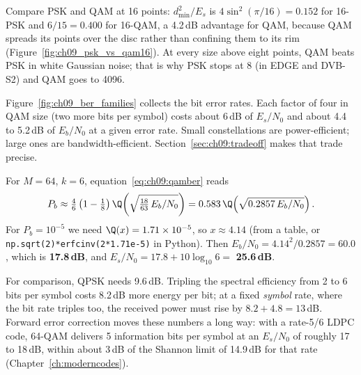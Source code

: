 Compare PSK and QAM at 16 points: $d_{\min}^2/E_s$ is $4\sin^2(\pi/16)=0.152$ for 16-PSK and
$6/15=0.400$ for 16-QAM, a 4.2\,dB advantage for QAM, because QAM spreads its points over the
disc rather than confining them to its rim (Figure~\ref{fig:ch09_psk_vs_qam16}). At every size
above eight points, QAM beats PSK in white Gaussian noise; that is why PSK stops at 8 (in EDGE and
DVB-S2) and QAM goes to 4096.


Figure~\ref{fig:ch09_ber_families} collects the bit error rates. Each factor of four in QAM size
(two more bits per symbol) costs about 6\,dB of $E_s/N_0$ and about 4.4 to 5.2\,dB of $E_b/N_0$ at a
given error rate. Small constellations are power-efficient; large ones are bandwidth-efficient.
Section~\ref{sec:ch09:tradeoff} makes that trade precise.


\begin{worked}
For $M=64$, $k=6$, equation~\eqref{eq:ch09:qamber} reads
\[
P_b\approx\tfrac46\left(1-\tfrac18\right)\Q\!\left(\sqrt{\tfrac{18}{63}\,E_b/N_0}\right)
=0.583\,\Q\!\left(\sqrt{0.2857\,E_b/N_0}\right).
\]
For $P_b=10^{-5}$ we need $\Q(x)=1.71\times10^{-5}$, so $x\approx4.14$ (from a table, or
\texttt{np.sqrt(2)*erfcinv(2*1.71e-5)} in Python). Then $E_b/N_0=4.14^2/0.2857=60.0$, which is
\textbf{17.8\,dB}, and $E_s/N_0=17.8+10\log_{10}6=$ \textbf{25.6\,dB}.

For comparison, QPSK needs 9.6\,dB. Tripling the spectral efficiency from 2 to 6 bits per symbol
costs 8.2\,dB more energy per bit; at a fixed \emph{symbol} rate, where the bit rate triples too,
the received power must rise by $8.2+4.8=13$\,dB. Forward error correction moves these numbers a
long way: with a rate-5/6 LDPC code, 64-QAM delivers 5 information bits per symbol at an
$E_s/N_0$ of roughly 17 to 18\,dB, within about 3\,dB of the Shannon limit of 14.9\,dB for that
rate (Chapter~\ref{ch:moderncodes}).
\end{worked}

